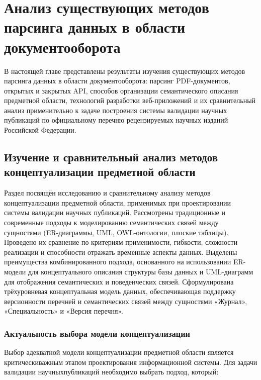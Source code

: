 \chapter{Анализ существующих методов парсинга данных в области документооборота}
\label{chapter1}

В настоящей главе представлены результаты изучения существующих 
методов парсинга данных в области документооборота: парсинг PDF-документов,
открытых и закрытых API, способов организации семантического описания предметной области, 
технологий разработки веб-приложений и их сравнительный анализ применительно
к задаче построения системы валидации научных публикаций по официальному перечню
рецензируемых научных изданий Российской Федерации.

\section{Изучение и сравнительный анализ методов концептуализации предметной области}

\nocite{cognitive-systems-research}

\begin{annotation}
	Раздел посвящён исследованию и сравнительному анализу методов концептуализации 
	предметной области, применимых при проектировании системы валидации научных публикаций. 
	Рассмотрены традиционные и современные подходы к моделированию
    семантических связей между сущностями (ER-диаграммы, UML, OWL-онтологии, плоские
	таблицы). Проведено их сравнение по критериям применимости, гибкости, сложности реализации 
	и способности отражать временные аспекты данных. Выделены преимущества
	комбинированного подхода, основанного на использовании ER-модели для концептуального
	описания структуры базы данных и UML-диаграмм для отображения семантических и поведенческих связей. 
	Сформулирована трёхуровневая концептуальная модель данных, обеспечивающая 
	поддержку версионности перечней и семантических связей между сущностями «Журнал», «Специальность» и «Версия перечня».
\end{annotation}


\subsection{Актуальность выбора модели концептуализации}

Выбор адекватной модели концептуализации предметной области
является критическиважным этапом проектирования информационной системы.
Для задачи валидации научныхпубликаций необходимо выбрать подход, который:

